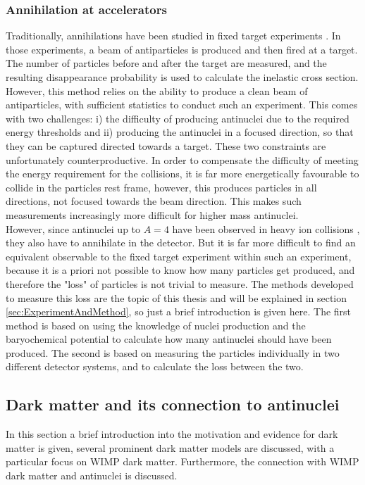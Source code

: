 \subsubsection{Annihilation at accelerators}
Traditionally, annihilations have been studied in fixed target experiments \cite{Binon:1970yu, Denisov:1971im, pbar_data}. In those experiments, a beam of antiparticles is produced and then fired at a target. The number of particles before and after the target are measured, and the resulting disappearance probability is used to calculate the inelastic cross section. However, this method relies on the ability to produce a clean beam of antiparticles, with sufficient statistics to conduct such an experiment. This comes with two challenges: i) the difficulty of producing antinuclei due to the required energy thresholds and ii) producing the antinuclei in a focused direction, so that they can be captured directed towards a target. These two constraints are unfortunately counterproductive. In order to compensate the difficulty of meeting the energy requirement for the collisions, it is far more energetically favourable to collide in the particles rest frame, however, this produces particles in all directions, not focused towards the beam direction. This makes such measurements increasingly more difficult for higher mass antinuclei.\\

However, since antinuclei up to $A=4$ have been observed in heavy ion collisions \cite{4He_PbPb}, they also have to annihilate in the detector. But it is far more difficult to find an equivalent observable to the fixed target experiment within such an experiment, because it is a priori not possible to know how many particles get produced, and therefore the "loss" of particles is not trivial to measure. The methods developed to measure this loss are the topic of this thesis and will be explained in section \ref{sec:ExperimentAndMethod}, so just a brief introduction is given here. The first method is based on using the knowledge of nuclei production and the baryochemical potential to calculate how many antinuclei should have been produced. The second is based on measuring the particles individually in two different detector systems, and to calculate the loss between the two. 

\subsection{Dark matter and its connection to antinuclei}
In this section a brief introduction into the motivation and evidence for dark matter is given, several prominent dark matter models are discussed, with a particular focus on WIMP dark matter. Furthermore, the connection with WIMP dark matter and antinuclei is discussed. 
